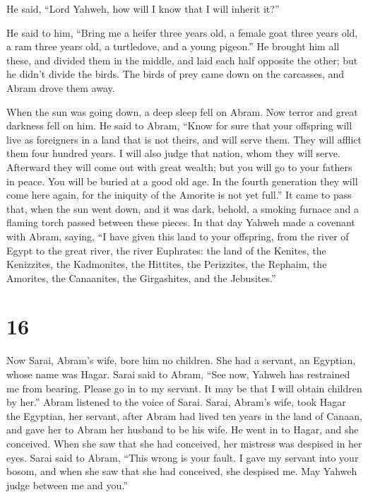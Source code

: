  He said, ``Lord Yahweh, how will I know that I will
inherit it?''

 He said to him, ``Bring me a heifer three years old, a
female goat three years old, a ram three years old, a turtledove, and a
young pigeon.''  He brought him all these, and divided
them in the middle, and laid each half opposite the other; but he didn't
divide the birds.  The birds of prey came down on the
carcasses, and Abram drove them away.

 When the sun was going down, a deep sleep fell on Abram.
Now terror and great darkness fell on him.  He said to
Abram, ``Know for sure that your offspring will live as foreigners in a
land that is not theirs, and will serve them. They will afflict them
four hundred years.  I will also judge that nation, whom
they will serve. Afterward they will come out with great wealth;
 but you will go to your fathers in peace. You will be
buried at a good old age.  In the fourth generation they
will come here again, for the iniquity of the Amorite is not yet full.''
 It came to pass that, when the sun went down, and it was
dark, behold, a smoking furnace and a flaming torch passed between these
pieces.  In that day Yahweh made a covenant with Abram,
saying, ``I have given this land to your offspring, from the river of
Egypt to the great river, the river Euphrates:  the land
of the Kenites, the Kenizzites, the Kadmonites,  the
Hittites, the Perizzites, the Rephaim,  the Amorites, the
Canaanites, the Girgashites, and the Jebusites.''

\hypertarget{section-15}{%
\section{16}\label{section-15}}

 Now Sarai, Abram's wife, bore him no children. She had a
servant, an Egyptian, whose name was Hagar.  Sarai said to
Abram, ``See now, Yahweh has restrained me from bearing. Please go in to
my servant. It may be that I will obtain children by her.'' Abram
listened to the voice of Sarai.  Sarai, Abram's wife, took
Hagar the Egyptian, her servant, after Abram had lived ten years in the
land of Canaan, and gave her to Abram her husband to be his wife.
 He went in to Hagar, and she conceived. When she saw that
she had conceived, her mistress was despised in her eyes. 
Sarai said to Abram, ``This wrong is your fault. I gave my servant into
your bosom, and when she saw that she had conceived, she despised me.
May Yahweh judge between me and you.''

